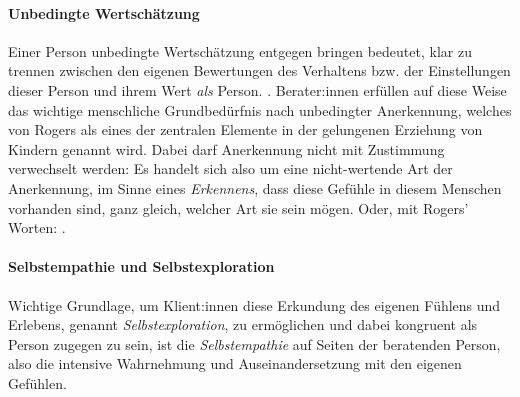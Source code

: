 \documentclass[
  twoside,
  parskip=half-,
]{scrreprt}
\begin{document}
\paragraph{Unbedingte Wertschätzung} Einer Person unbedingte Wertschätzung entgegen bringen bedeutet, klar zu trennen zwischen den eigenen Bewertungen des Verhaltens bzw. der Einstellungen dieser Person und ihrem Wert \textit{als} Person. . Berater:innen erfüllen auf diese Weise das wichtige menschliche Grundbedürfnis nach unbedingter Anerkennung, welches von Rogers als eines der zentralen Elemente in der gelungenen Erziehung von Kindern genannt wird. Dabei darf Anerkennung nicht mit Zustimmung verwechselt werden:  Es handelt sich also um eine nicht-wertende Art der Anerkennung, im Sinne eines \textit{Erkennens}, dass diese Gefühle in diesem Menschen vorhanden sind, ganz gleich, welcher Art sie sein mögen. Oder, mit Rogers' Worten: .

\paragraph{Selbstempathie und Selbstexploration} Wichtige Grundlage, um Klient:innen diese Erkundung des eigenen Fühlens und Erlebens, genannt \textit{Selbstexploration}, zu ermöglichen und dabei kongruent als Person zugegen zu sein, ist die \textit{Selbstempathie} auf 
Seiten der beratenden Person, also die intensive Wahrnehmung und Auseinandersetzung mit den eigenen Gefühlen. 
\end{document}
